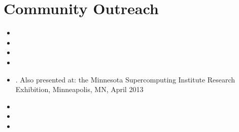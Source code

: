 \documentclass{report}
\begin{document}
\fi

\chapter{Community Outreach}


\begin{itemize} 
        \item {}
        \item {}
        \item {}
        \item {}     
        \item {}. Also presented at: the Minnesota Supercomputing Institute Research Exhibition, Minneapolis, MN, April 2013
        \item {}
        \item {}              
        \item {}
\end{itemize}



\ifstandalone


\end{document}
